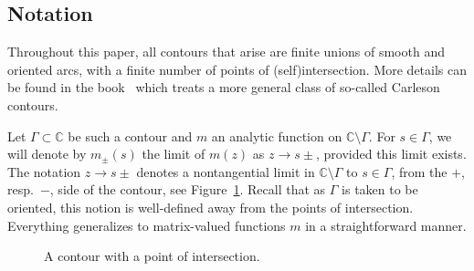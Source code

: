 \documentclass[11pt]{article}
\numberwithin{equation}{section}
\newcommand{\C}{\mathbb{C}}
\numberwithin{equation}{section}
\begin{document}
\setcounter{subsection}{4}
\subsection{Notation}

Throughout this paper, all contours that arise are finite unions of smooth and oriented arcs, with a finite number of points of (self)intersection. More details can be found in the book~\cite{BK} which treats a more general class of so-called Carleson contours.

Let $\Gamma \subset \C$ be such a contour and $m$ an analytic function on $\C \setminus \Gamma$. For $s \in \Gamma$, we will denote by $m_{\pm}(s)$ the limit of $m(z)$ as $z \to s\pm$, provided this limit exists. The notation $z \to s\pm$ denotes a nontangential limit in $\C \setminus \Gamma$ to $s \in\Gamma$, from the $+$, resp.\ $-$, side of the contour, see Figure~\ref{FigContour}. Recall that as $\Gamma$ is taken to be oriented, this notion is well-defined away from the points of intersection. Everything generalizes to matrix-valued functions $m$ in a straightforward manner.

\begin{figure}[th]\centering\vspace*{2mm}
\caption{A contour with a point of intersection.}\label{FigContour}
\end{figure}
\end{document}
